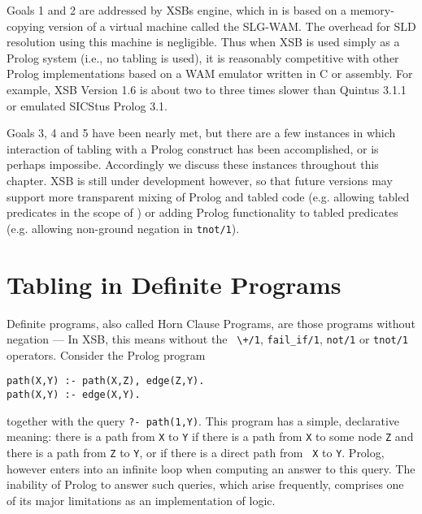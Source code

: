 Goals 1 and 2 are addressed by XSBs engine, which in \version{} is
based on a memory-copying version of a virtual machine called the
SLG-WAM.  The overhead for SLD resolution using this machine is
negligible.  Thus when XSB is used simply as a Prolog system (i.e., no
tabling is used), it is reasonably competitive with other Prolog
implementations based on a WAM emulator written in C or assembly.  For
example, XSB Version 1.6 is about two to three times slower than
Quintus 3.1.1 or emulated SICStus Prolog 3.1.

Goals 3, 4 and 5 have been nearly met, but there are a few instances
in which interaction of tabling with a Prolog construct has been
accomplished, or is perhaps impossibe.  Accordingly we discuss these
instances throughout this chapter.  XSB is still under development
however, so that future versions may support more transparent mixing
of Prolog and tabled code (e.g. allowing tabled predicates in the
scope of \not) or adding Prolog functionality to tabled predicates
(e.g. allowing non-ground negation in {\tt tnot/1}).

\section{Tabling in Definite Programs}	\label{sec:def}

Definite programs, also called Horn Clause Programs, are those
programs without negation --- In XSB, this means without the {\tt
\verb|\+|/1}, {\tt fail\_if/1}, {\tt not/1} or {\tt tnot/1} operators.
Consider the Prolog program
\begin{center}
\begin{minipage}{3.8in}
\begin{verbatim}
path(X,Y) :- path(X,Z), edge(Z,Y).
path(X,Y) :- edge(X,Y).
\end{verbatim}						       
\end{minipage}
\end{center}
together with the query {\tt ?- path(1,Y)}.  This program has a
simple, declarative meaning: there is a path from {\tt X} to {\tt Y}
if there is a path from {\tt X} to some node {\tt Z} and there is a
path from {\tt Z} to {\tt Y}, or if there is a direct path from {\tt
X} to {\tt Y}.  Prolog, however enters into an infinite loop when
computing an answer to this query.  The inability of Prolog to answer
such queries, which arise frequently, comprises one of its major
limitations as an implementation of logic.

